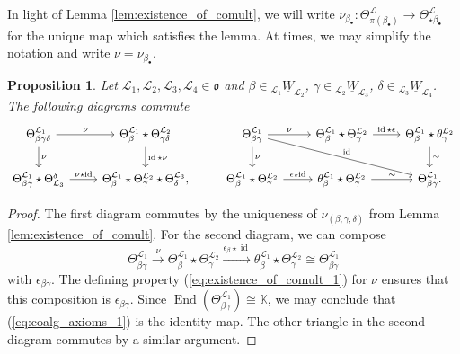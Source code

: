 \documentclass{amsart}
\newcommand{\K}{\mathbb{K}}
\newcommand{\scrL}{\mathcal{L}}
\DeclareMathOperator{\End}{End}
\DeclareMathOperator{\id}{id}
\newcommand{\fr}[1]{\mathfrak{#1}}
\newcommand{\uW}[2]{{}_{#1}\underline{W}_{#2}}
\newtheorem{proposition}[subsubsection]{Proposition}
\theoremstyle{definition}
\numberwithin{equation}{subsection}
\begin{document}
In light of Lemma \ref{lem:existence_of_comult}, we will write $\nu_{\beta_{\bullet}} : \Theta^{\scrL}_{\pi (\beta_{\bullet})} \to \Theta^{\scrL}_{\star \beta_{\bullet}}$ for the unique map which satisfies the lemma.
At times, we may simplify the notation and write $\nu = \nu_{\beta_{\bullet}}$.

\begin{proposition}\label{prop:coalg_axioms}
    Let $\scrL_1, \scrL_2, \scrL_3, \scrL_4 \in \fr{o}$ and $\beta \in \uW{\scrL_1}{\scrL_2}$,  $\gamma \in \uW{\scrL_2}{\scrL_3}$,  $\delta \in \uW{\scrL_3}{\scrL_4}$.
    The following diagrams commute
    \[\begin{tikzcd}
        \Theta^{\scrL_1}_{\beta \gamma \delta} \arrow[r, "\nu"] \arrow[d, "\nu"]                   & \Theta^{\scrL_1}_{\beta} \star \Theta^{\scrL_2}_{\gamma \delta}  \arrow[d, "\id \star \nu"]  & \Theta^{\scrL_1}_{\beta \gamma} \arrow[d, "\nu"] \arrow[r, "\nu"] \arrow[rrd, "\id"]     & \Theta^{\scrL_1}_{\beta} \star \Theta^{\scrL_2}_{\gamma} \arrow[r, "\id \star \epsilon"] & \Theta^{\scrL_1}_{\beta} \star \theta^{\scrL_2}_{\gamma} \arrow[d, "\sim"] \\
        \Theta^{\scrL_1}_{\beta \gamma} \star \Theta_{\scrL_3}^{\delta} \arrow[r, "\nu \star \id"] & \Theta^{\scrL_1}_{\beta} \star \Theta^{\scrL_2}_{\gamma} \star \Theta^{\scrL_3}_{\delta},     & \Theta^{\scrL_1}_{\beta} \star \Theta^{\scrL_2}_{\gamma} \arrow[r, "\epsilon \star \id"] & \theta^{\scrL_1}_{\beta} \star \Theta^{\scrL_2}_{\gamma} \arrow[r, "\sim"]               & \Theta^{\scrL_1}_{\beta \gamma}.                                           
        \end{tikzcd}\]
\end{proposition}
\begin{proof}
    The first diagram commutes by the uniqueness of $\nu_{(\beta, \gamma, \delta)}$ from Lemma \ref{lem:existence_of_comult}.
   For the second diagram, we can compose 
   \begin{equation}\label{eq:coalg_axioms_1}
    \Theta^{\scrL_1}_{\beta \gamma} \stackrel{\nu}{\to} \Theta^{\scrL_1}_{\beta} \star \Theta^{\scrL_2}_{\gamma} \stackrel{\epsilon_{\beta} \star \id}{\to} \theta^{\scrL_1}_{\beta} \star \Theta^{\scrL_2}_{\gamma} \cong \Theta^{\scrL_1}_{\beta \gamma}
   \end{equation}
   with $\epsilon_{\beta \gamma}$.
   The defining property (\ref{eq:existence_of_comult_1}) for $\nu$ ensures that this composition is $\epsilon_{\beta \gamma}$.
   Since $\End (\Theta^{\scrL_1}_{\beta \gamma}) \cong \K$, we may conclude that (\ref{eq:coalg_axioms_1}) is the identity map. The other triangle in the second diagram commutes by a similar argument.
\end{proof}
\end{document}
